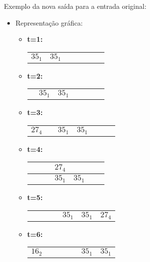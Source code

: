 \begin{enumerate}
Exemplo da nova saída para a entrada original:
\begin{itemize}
    \item Representação gráfica:
    \begin{itemize}
        \item \textbf{t=1:} \begin{tabular}{|p{1cm}|p{1cm}|p{1cm}|p{1cm}|p{1cm}|p{1cm}|p{1cm}|}
            \hline & & & & & &\\
            \hline $35_1$&$35_1$& & & & &\\ \hline \end{tabular}
        \item \textbf{t=2:} \begin{tabular}{|p{1cm}|p{1cm}|p{1cm}|p{1cm}|p{1cm}|p{1cm}|p{1cm}|}
            \hline & & & & & &\\ 
            \hline &$35_1$& $35_1$& & & &\\ \hline \end{tabular}
        \item \textbf{t=3:} \begin{tabular}{|p{1cm}|p{1cm}|p{1cm}|p{1cm}|p{1cm}|p{1cm}|p{1cm}|}
            \hline & & & & & &\\ 
            \hline $27_4$& & $35_1$&$35_1$ & & &\\ \hline \end{tabular}
        \item \textbf{t=4:} \begin{tabular}{|p{1cm}|p{1cm}|p{1cm}|p{1cm}|p{1cm}|p{1cm}|p{1cm}|}
            \hline & & & $27_4$& & &\\ 
            \hline & & & $35_1$& $35_1$& &\\ \hline \end{tabular}
        \item \textbf{t=5:} \begin{tabular}{|p{1cm}|p{1cm}|p{1cm}|p{1cm}|p{1cm}|p{1cm}|p{1cm}|}
            \hline & & & & & &\\ 
            \hline & & & & $35_1$& $35_1$&$27_4$\\ \hline \end{tabular} 
        \item \textbf{t=6:} \begin{tabular}{|p{1cm}|p{1cm}|p{1cm}|p{1cm}|p{1cm}|p{1cm}|p{1cm}|}
            \hline & & & & & &\\ 
            \hline $16_2$& & & & & $35_1$& $35_1$ \\ \hline \end{tabular} 

\end{itemize}
\end{itemize}
\end{enumerate}
